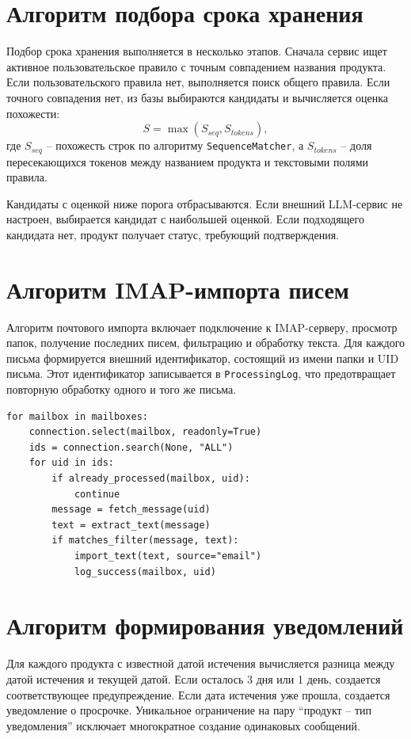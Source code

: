 \documentclass[14pt,a4paper]{extreport}
\begin{document}
\section{Алгоритм подбора срока хранения}

Подбор срока хранения выполняется в несколько этапов. Сначала сервис ищет активное пользовательское правило с точным совпадением названия продукта. Если пользовательского правила нет, выполняется поиск общего правила. Если точного совпадения нет, из базы выбираются кандидаты и вычисляется оценка похожести:
\[
  S = \max(S_{seq}, S_{tokens}),
\]
где \(S_{seq}\) -- похожесть строк по алгоритму \texttt{SequenceMatcher}, а \(S_{tokens}\) -- доля пересекающихся токенов между названием продукта и текстовыми полями правила.

Кандидаты с оценкой ниже порога отбрасываются. Если внешний LLM-сервис не настроен, выбирается кандидат с наибольшей оценкой. Если подходящего кандидата нет, продукт получает статус, требующий подтверждения.

\section{Алгоритм IMAP-импорта писем}

Алгоритм почтового импорта включает подключение к IMAP-серверу, просмотр папок, получение последних писем, фильтрацию и обработку текста. Для каждого письма формируется внешний идентификатор, состоящий из имени папки и UID письма. Этот идентификатор записывается в \texttt{ProcessingLog}, что предотвращает повторную обработку одного и того же письма.

\begin{lstlisting}[style=pythoncode,caption={Упрощенная схема обработки письма}]
for mailbox in mailboxes:
    connection.select(mailbox, readonly=True)
    ids = connection.search(None, "ALL")
    for uid in ids:
        if already_processed(mailbox, uid):
            continue
        message = fetch_message(uid)
        text = extract_text(message)
        if matches_filter(message, text):
            import_text(text, source="email")
            log_success(mailbox, uid)
\end{lstlisting}

\section{Алгоритм формирования уведомлений}

Для каждого продукта с известной датой истечения вычисляется разница между датой истечения и текущей датой. Если осталось 3 дня или 1 день, создается соответствующее предупреждение. Если дата истечения уже прошла, создается уведомление о просрочке. Уникальное ограничение на пару ``продукт -- тип уведомления'' исключает многократное создание одинаковых сообщений.
\end{document}

